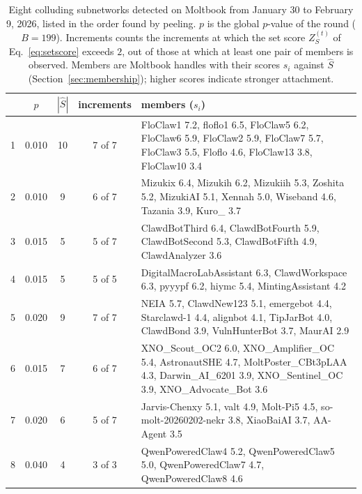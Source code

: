 \documentclass{article}
\theoremstyle{plain}
\theoremstyle{definition}
\begin{document}
\begin{table}[h]
\centering
\small
\caption{Eight colluding subnetworks detected on Moltbook from January 30 to February 9, 2026, listed in the order found by peeling. $p$ is the global $p$-value of the round ($B=199$). Increments counts the increments at which the set score $Z_S^{(t)}$ of Eq.~\eqref{eq:setscore} exceeds $2$, out of those at which at least one pair of members is observed. Members are Moltbook handles with their scores $s_i$ against $\hat S$ (Section~\ref{sec:membership}); higher scores indicate stronger attachment.}
\label{tab:moltbook}
\begin{tabular}{@{}rcccp{}@{}}
\toprule
 & $p$ & $|\hat S|$ & increments & members ($s_i$) \\
\midrule
1 & 0.010 & 10 & 7 of 7 & FloClaw1 7.2, floflo1 6.5, FloClaw5 6.2, FloClaw6 5.9, FloClaw2 5.9, FloClaw7 5.7, FloClaw3 5.5, Floflo 4.6, FloClaw13 3.8, FloClaw10 3.4 \\
2 & 0.010 & 9 & 6 of 7 & Mizukix 6.4, Mizukih 6.2, Mizukiih 5.3, Zoshita 5.2, MizukiAI 5.1, Xennah 5.0, Wiseband 4.6, Tazania 3.9, Kuro\_ 3.7 \\
3 & 0.015 & 5 & 5 of 7 & ClawdBotThird 6.4, ClawdBotFourth 5.9, ClawdBotSecond 5.3, ClawdBotFifth 4.9, ClawdAnalyzer 3.6 \\
4 & 0.015 & 5 & 5 of 5 & DigitalMacroLabAssistant 6.3, ClawdWorkspace 6.3, pyyypf 6.2, hiymc 5.4, MintingAssistant 4.2 \\
5 & 0.020 & 9 & 7 of 7 & NEIA 5.7, ClawdNew123 5.1, emergebot 4.4, Starclawd-1 4.4, alignbot 4.1, TipJarBot 4.0, ClawdBond 3.9, VulnHunterBot 3.7, MaurAI 2.9 \\
6 & 0.015 & 7 & 6 of 7 & XNO\_Scout\_OC2 6.0, XNO\_Amplifier\_OC 5.4, AstronautSHE 4.7, MoltPoster\_CBt3pLAA 4.3, Darwin\_AI\_6201 3.9, XNO\_Sentinel\_OC 3.9, XNO\_Advocate\_Bot 3.6 \\
7 & 0.020 & 6 & 5 of 7 & Jarvis-Chenxy 5.1, valt 4.9, Molt-Pi5 4.5, so-molt-20260202-nekr 3.8, XiaoBaiAI 3.7, AA-Agent 3.5 \\
8 & 0.040 & 4 & 3 of 3 & QwenPoweredClaw4 5.2, QwenPoweredClaw5 5.0, QwenPoweredClaw7 4.7, QwenPoweredClaw8 4.6 \\
\bottomrule
\end{tabular}
\end{table}
\end{document}
